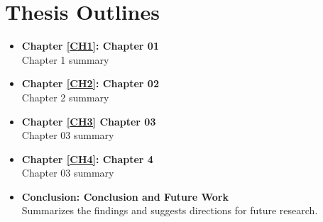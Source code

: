 \chapter*{Thesis Outlines}

\begin{itemize}[leftmargin=10pt] 
	\item \textbf{Chapter \ref{CH1}: Chapter 01   } \\
	
	Chapter 1 summary 

	
	\item \textbf{Chapter \ref{CH2}: 	Chapter 02} \\
 		 	Chapter 2 summary 

	\item \textbf{Chapter \ref{CH3} Chapter 03 } \\
			Chapter 03 summary 
	
	\item \textbf{Chapter \ref{CH4}: 	Chapter 4 } \\
				Chapter 03 summary 
							
	\item \textbf{Conclusion: Conclusion and Future Work} \\
	Summarizes the findings and suggests directions for future research.
\end{itemize}
